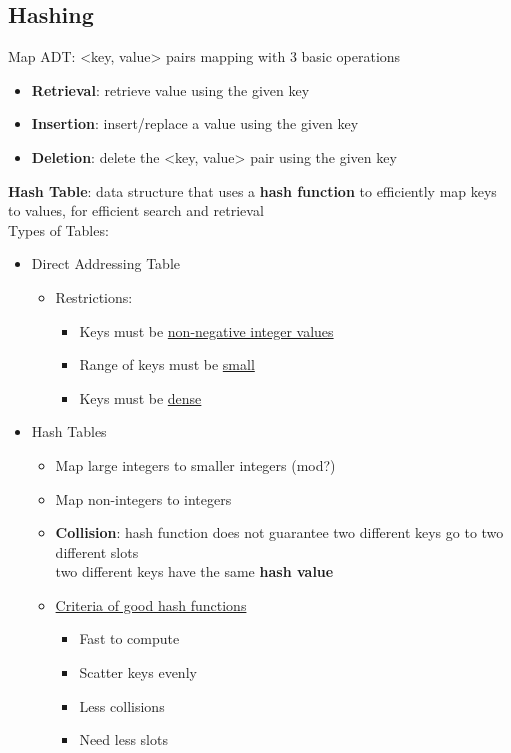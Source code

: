 \documentclass{article}
\begin{document}
\begin{multicols}{2}
\section{Hashing}
Map ADT: <key, value> pairs mapping with 3 basic operations
\begin{itemize}
	\item \textbf{Retrieval}: retrieve value using the given key
	\item \textbf{Insertion}: insert/replace a value using the given key
	\item \textbf{Deletion}: delete the <key, value> pair using the given key
\end{itemize}
\textbf{Hash Table}: data structure that uses a \textbf{hash function} to efficiently map keys to values, for efficient search and retrieval\\
Types of Tables:
\begin{itemize}
	\item Direct Addressing Table
	\begin{itemize}
		\item Restrictions:
		\begin{itemize}
			\item Keys must be \underline{non-negative integer values}
			\item Range of keys must be \underline{small}
			\item Keys must be \underline{dense}
		\end{itemize}
	\end{itemize}
    \item Hash Tables
    \begin{itemize}
    	\item Map large integers to smaller integers (mod?)
    	\item Map non-integers to integers
    	\item \textbf{Collision}: hash function does not guarantee two different keys go to two different slots\\
    	two different keys have the same \textbf{hash value}
    	\item \underline{Criteria of good hash functions}
    	\begin{itemize}
    		\item Fast to compute
    		\item Scatter keys evenly
    		\item Less collisions
    		\item Need less slots
    	\end{itemize}

\end{itemize}
\end{itemize}
\end{multicols}
\end{document}
